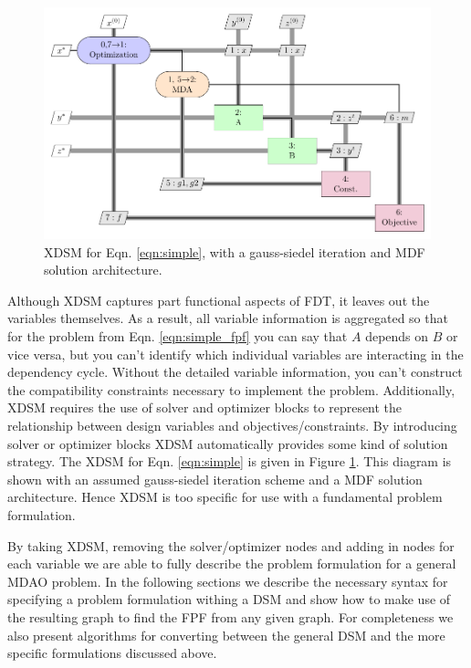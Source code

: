     \begin{figure}
        \begin{center}
        \includegraphics[height=.25\textheight]{XDSM/simple}
        \caption{XDSM for Eqn. \ref{eqn:simple}, with a gauss-siedel iteration and MDF solution architecture. \label{fig:XDSM_simple}}
        \end{center}
    \end{figure}

    Although XDSM captures part functional aspects of FDT, it  leaves out the variables themselves. As a result, all variable information is aggregated 
    so that for the problem from Eqn. \ref{eqn:simple_fpf} you can say that $A$ depends on $B$ or vice versa, but you can't identify which 
    individual variables are interacting in the dependency cycle. Without the detailed variable information, you can't construct the compatibility 
    constraints necessary to implement the problem. Additionally, XDSM requires the use of solver and optimizer blocks to represent 
    the relationship between design variables and objectives/constraints. By introducing solver or optimizer blocks XDSM automatically provides
    some kind of solution strategy. The XDSM for Eqn. \ref{eqn:simple} is given in Figure \ref{fig:XDSM_simple}. 
    This diagram is shown with an assumed gauss-siedel iteration scheme and a MDF solution architecture. 
    Hence XDSM is too specific for use with a fundamental problem formulation. 

    By taking XDSM, removing the solver/optimizer nodes and adding in nodes for each variable we are able to fully describe 
    the problem formulation for a general MDAO problem. In the following sections we describe the necessary syntax for specifying a 
    problem formulation withing a DSM and show how to make use of the resulting graph to find the FPF from any given graph. For completeness we 
    also present algorithms for converting between the general DSM and the more specific formulations discussed above. 


